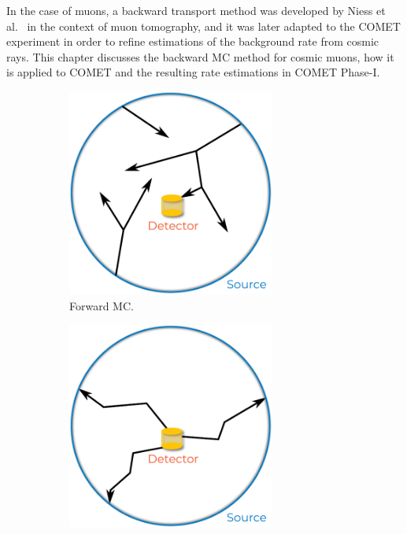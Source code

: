 In the case of muons, a backward transport method was developed by Niess et
al.~\cite{Niess_Barnoud_Carloganu_Menedeu_2018} in the context of muon
tomography, and it was later adapted to the COMET experiment in order to refine
estimations of the background rate from cosmic rays. This chapter discusses the
backward MC method for cosmic muons, how it is applied to COMET and the
resulting rate estimations in COMET Phase-I.

\begin{figure}
    \centering
    \begin{subfigure}[t]{0.49\textwidth}
        \centering
        \includegraphics[width=0.75\textwidth]{chapter5/bmc_setup.pdf}
        \caption{Forward MC.}
    \end{subfigure}
    \hfill
    \begin{subfigure}[t]{0.49\textwidth}
        \centering
        \includegraphics[width=0.75\textwidth]{chapter5/bmc_setup_backward.pdf}

\end{subfigure}
\end{figure}
